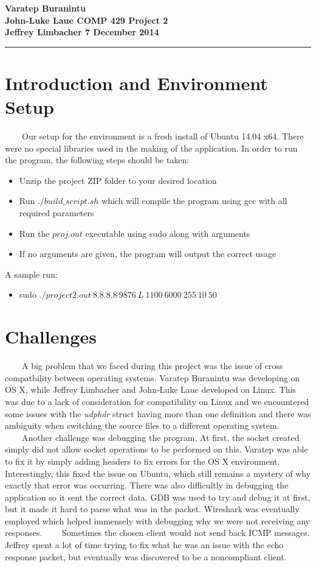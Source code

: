 \documentclass[11pt]{article}
\newcommand{\myname}{Project 2}
\newcommand{\course}{COMP 429}
\newcommand{\assignment}{Varatep Buranintu\\John-Luke Laue}
\newcommand{\probs}{Jeffrey Limbacher}
\newcommand{\duedate}{7 December 2014}
\newcommand{\mytitle}{
\begin{flushleft}
\bfseries
\assignment       \hspace*{\fill} \course \hspace*{\fill} \myname\\
\probs    \hspace*{\fill}                                 \duedate\\
\rule[10pt]{\linewidth}{1pt}
\end{flushleft}
}
\begin{document}
\thispagestyle{empty}   %
\mytitle                

\renewcommand{\qedsymbol}{}

\section{Introduction and Environment Setup}
\ \ \ \ Our setup for the environment is a fresh install of Ubuntu 14.04 x64. There were no special libraries used in the making of the application. In order to run the program, the following steps should be taken:\begin{itemize}
\item Unzip the project ZIP folder to your desired location
\item Run $./build\_script.sh$ which will compile the program using gcc with all required parameters
\item Run the $proj.out$ executable using sudo along with arguments
\item If no arguments are given, the program will output the correct usage
\end{itemize}
A sample run:
\begin{itemize}
\item sudo $./project2.out\ 8.8.8.8\ 9876\ L\ 1100\ 6000\ 255\ 10\ 50$
\end{itemize}

\section{Challenges}
\ \ \ \ A big problem that we faced during this project was the issue of cross compatbility between operating systems. Varatep Buranintu was developing on OS X, while Jeffrey Limbacher and John-Luke Laue developed on Linux. This was due to a lack of consideration for compatibility on Linux and we encountered some issues with the \textit{udphdr} struct having more than one definition and there was ambiguity when switching the source files to a different operating system. \newline
\ \ \ \ Another challenge was debugging the program. At first, the socket created simply did not allow socket operations to be performed on this. Varatep was able to fix it by simply adding headers to fix errors for the OS X environment. Interestingly, this fixed the issue on Ubuntu, which still remains a mystery of why exactly that error was occurring. There was also difficultly in debugging the application so it sent the correct data. GDB was used to try and debug it at first, but it made it hard to parse what was in the packet. Wireshark was eventually employed which helped immensely with debugging why we were not receiving any responses. \newline
\ \ \ \ Sometimes the chosen client would not send back ICMP messages. Jeffrey spent a lot of time trying to fix what he was an issue with the echo response packet, but eventually was discovered to be a noncompliant client.
\end{document}
